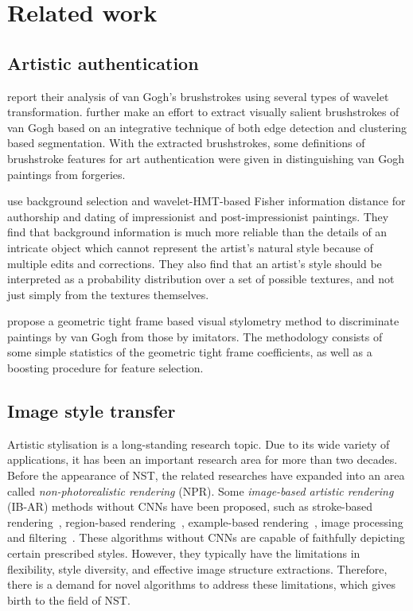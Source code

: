 \documentclass{article}
\begin{document}
\section{Related work}
\label{related-work}


\subsection{Artistic authentication}

\citet{johnson2008image} report their analysis of van Gogh’s brushstrokes using several types of wavelet transformation.
\citet{li2011rhythmic} further make an effort to extract visually salient brushstrokes of van Gogh based on an integrative technique of both edge detection and clustering based segmentation. 
With the extracted brushstrokes, some definitions of brushstroke features for art authentication were given in distinguishing van Gogh paintings from forgeries.

\citet{qi2013visual} use background selection and wavelet-HMT-based Fisher information distance for authorship and dating of impressionist and post-impressionist paintings. 
They find that background information is much more reliable than the details of an intricate object which cannot represent the artist's natural style because of multiple edits and corrections. They also find that an artist's style should be interpreted as a probability distribution over a set of possible textures, and not just simply from the textures themselves.

\citet{liu2016geometric} propose a geometric tight frame based visual stylometry method to discriminate paintings by van Gogh from those by imitators. 
The methodology consists of some simple statistics of the geometric tight frame coefficients, as well as a boosting procedure for feature selection.

\subsection{Image style transfer}

Artistic stylisation is a long-standing research topic. 
Due to its wide variety of applications, it has been an important research area for more than two decades. 
Before the appearance of NST, the related researches have expanded into an area called \textit{non-photorealistic rendering} (NPR). 
Some \textit{image-based artistic rendering} (IB-AR) methods without CNNs have been proposed, such as stroke-based rendering~\citep{hertzmann1998painterly}, region-based rendering~\citep{kolliopoulos2005image,gooch2002artistic,song2008arty}, example-based rendering~\citep{hertzmann2001image,zhao2011portrait}, image processing and filtering~\citep{winnemoller2006real}. 
These algorithms without CNNs are capable of faithfully depicting certain prescribed styles. However, they typically have the
limitations in flexibility, style diversity, and effective image structure extractions. 
Therefore, there is a demand for novel algorithms to address these limitations, which gives birth to the field of NST.
\end{document}
